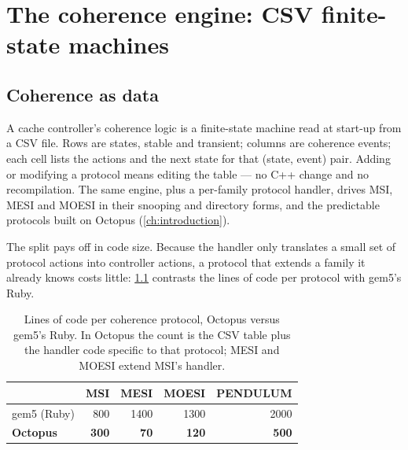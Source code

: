 \chapter[The coherence engine]{The coherence engine: CSV finite-state machines}\label{ch:coherence-engine}


\section{Coherence as data}

A cache controller's coherence logic is a finite-state machine read at start-up from a CSV
file. Rows are states, stable and transient; columns are coherence events; each cell lists the
actions and the next state for that (state, event) pair. Adding or modifying a protocol means
editing the table --- no C++ change and no recompilation. The same engine,  plus
a per-family protocol handler, drives MSI, MESI and MOESI in their snooping and directory forms,
and the predictable protocols built on Octopus (\cref{ch:introduction}).

The split pays off in code size. Because the handler only translates a small set of protocol
actions into controller actions, a protocol that extends a family it already knows costs little:
\cref{tab:loc} contrasts the lines of code per protocol with gem5's Ruby.

\begin{table}[htbp]\centering\small
\caption{Lines of code per coherence protocol, Octopus versus gem5's Ruby. In Octopus the count
is the CSV table plus the handler code specific to that protocol; MESI and MOESI extend MSI's
handler.}\label{tab:loc}
\begin{tabular}{@{}lrrrr@{}}
\toprule & MSI & MESI & MOESI & PENDULUM \\ \midrule
gem5 (Ruby) & 800 & 1400 & 1300 & 2000 \\
\textbf{Octopus} & \textbf{300} & \textbf{70} & \textbf{120} & \textbf{500} \\
\bottomrule
\end{tabular}
\end{table}

